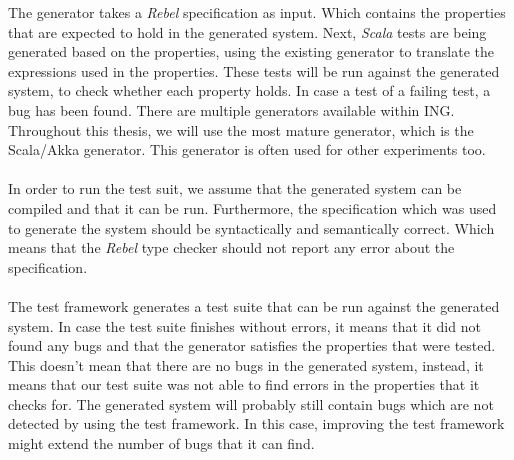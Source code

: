The generator takes a \textit{Rebel} specification as input. Which contains the properties that are expected to hold in the generated system. Next, \textit{Scala} tests are being generated based on the properties, using the existing generator to translate the expressions used in the properties. These tests will be run against the generated system, to check whether each property holds. In case a test of a failing test, a bug has been found. There are multiple generators available within ING. Throughout this thesis, we will use the most mature generator, which is the Scala/Akka generator. This generator is often used for other experiments too.\\
\\
In order to run the test suit, we assume that the generated system can be compiled and that it can be run. Furthermore, the specification which was used to generate the system should be syntactically and semantically correct. Which means that the \textit{Rebel} type checker should not report any error about the specification.\\
\\
The test framework generates a test suite that can be run against the generated system. In case the test suite finishes without errors, it means that it did not found any bugs and that the generator satisfies the properties that were tested. This doesn't mean that there are no bugs in the generated system, instead, it means that our test suite was not able to find errors in the properties that it checks for. The generated system will probably still contain bugs which are not detected by using the test framework. In this case, improving the test framework might extend the number of bugs that it can find.

